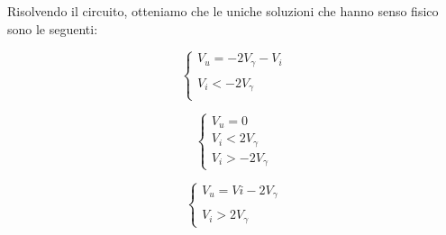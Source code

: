\documentclass[../elettronica]{subfiles}
\begin{document}
\noindent Risolvendo il circuito, otteniamo che le uniche soluzioni che hanno senso fisico sono le seguenti:
\\[10pt]
\begin{minipage}{.32\textwidth}
    \begin{tcolorbox}[title={D1,D4 OFF\\D2,D3 ON}]
        \[\begin{cases}
            V_u = -2 V_\gamma - V_i\\
            \\
            V_i < -2 V_\gamma\\
        \end{cases}\]
    \end{tcolorbox}
\end{minipage}
\begin{minipage}{.33\textwidth}
    \begin{tcolorbox}[title={D1,D2\\D3,D4 OFF}]
        \[\begin{cases}
            V_u = 0\\
            V_i < 2V_\gamma\\
            V_i > -2 V_\gamma
        \end{cases}\]
    \end{tcolorbox}
\end{minipage}
\begin{minipage}{.32\textwidth}
    \begin{tcolorbox}[title={D1,D4 ON\\D2,D3 OFF}]
        \[\begin{cases}
            V_u = Vi - 2 V_\gamma\\
            \\
            V_i > 2 V_\gamma
        \end{cases}\]
    \end{tcolorbox}
\end{minipage}
\end{document}
